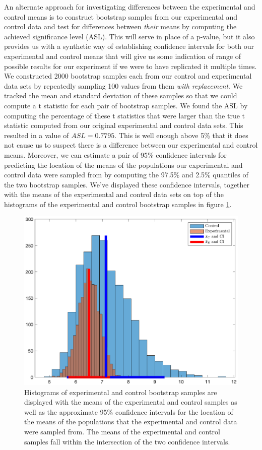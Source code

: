 \documentclass{amsart}
\begin{document}
An alternate approach for investigating differences between the experimental and control means is to construct bootstrap samples from our experimental and control data and test for differences between \textsl{their} means by computing the achieved significance level (ASL). This will serve in place of a p-value, but it also provides us with a synthetic way of establishing confidence intervals for both our experimental and control means that will give us some indication of range of possible results for our experiment if we were to have replicated it multiple times. We constructed 2000 bootstrap samples each from our control and experimental data sets by repeatedly sampling 100 values from them \textsl{with replacement}. We tracked the mean and standard deviation of these samples so that we could compute a t statistic for each pair of bootstrap samples. We found the ASL by computing the percentage of these t statistics that were larger than the true t statistic computed from our original experimental and control data sets. This resulted in a value of $ASL=0.7795$. This is well enough above 5\% that it does not cause us to suspect there is a difference between our experimental and control means. Moreover, we can estimate a pair of 95\% confidence intervals for predicting the location of the means of the populations our experimental and control data were sampled from by computing the 97.5\% and 2.5\% quantiles of the two bootstrap samples. We've displayed these confidence intervals, together with the means of the experimental and control data sets on top of the histograms of the experimental and control bootstrap samples in figure \ref{F:bootstrap}.
\begin{figure}[H]
\centering
\includegraphics[scale=0.55]{bootstrapTwoSample}
\caption{
Histograms of experimental and control bootstrap samples are displayed with the means of the experimental and control samples as well as the approximate 95\% confidence intervals for the location of the means of the populations that the experimental and control data were sampled from. The means of the experimental and control samples fall within the intersection of the two confidence intervals.\label{F:bootstrap}}
\end{figure}
\end{document}
